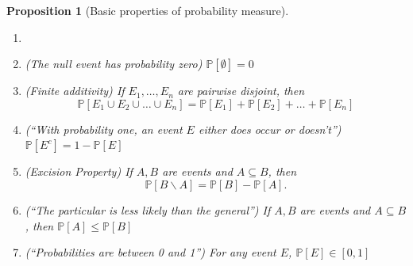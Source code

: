 \documentclass[10pt]{article}
\newtheorem{proposition}[theorem]{Proposition}
\theoremstyle{definition}
\newcommand{\1}[1]{\textbf{1}_{\left[#1\right]}} %
\def\P{\mathbb{P}} %
\begin{document}
\begin{proposition}[Basic properties of probability measure]
  \label{prop:some-deductions-from-axioms}
  \begin{enumerate}[label=\rm{(\roman*.)}]
    \item []
    \item (The null event has probability zero) \label{item:empty-set-has-prob-zero}
    $\P\left[\emptyset \right] = 0$
    \item (Finite additivity) \label{item:finite-additivity} If
    $E_{1},\ldots,E_{n}$ are pairwise disjoint, then
    \begin{equation*}
      \P\left[E_{1}\cup E_{2}\cup\ldots\cup E_{n} \right] 
      = \P\left[E_{1} \right]+\P\left[E_{2} \right]+\ldots+\P\left[E_{n} \right]
    \end{equation*}
    \item (``With probability one, an event $E$ either does occur or doesn't'') \label{item:complements} $\P\left[E^{c} \right] = 1-\P\left[E \right]$
    \item (Excision Property) \label{item:excision-property} If $A,B$ are events and $A\subseteq B$, then
    \begin{equation*}
      \P\left[B\backslash A \right] = \P\left[B \right] - \P\left[A \right].
    \end{equation*}
    \item (``The particular is less likely than the general'') \label{item:subsets} If $A,B$ are events and $A\subseteq B$, then
    $\P\left[ A\right] \leq \P\left[B \right]$
    \item (``Probabilities are between 0 and 1'') \label{item:probabilities-are-in-unit-interval} For any event $E$,  $\P\left[E \right]\in [0,1]$
  \end{enumerate}
\end{proposition}
\end{document}
